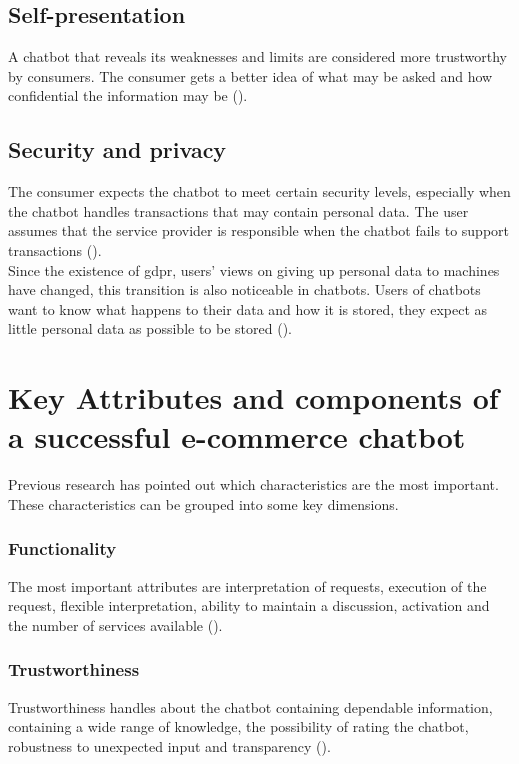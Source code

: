 \subsection{Self-presentation}
A chatbot that reveals its weaknesses and limits are considered more trustworthy by consumers. The consumer gets a better idea of what may be asked and how confidential the information may be (\cite{Følstad2018}).

\subsection{Security and privacy}
The consumer expects the chatbot to meet certain security levels, especially when the chatbot handles transactions that may contain personal data. The user assumes that the service provider is responsible when the chatbot fails to support transactions (\cite{Følstad2018, Nordheim2019}).\\
\break
Since the existence of \acrfull{gdpr}, users' views on giving up personal data to machines have changed, this transition is also noticeable in chatbots. Users of chatbots want to know what happens to their data and how it is stored, they expect as little personal data as possible to be stored (\cite{Følstad2018, Nordheim2019}). 


\section{Key Attributes and components of a successful e-commerce chatbot}
Previous research has pointed out which characteristics are the most important. These characteristics can be grouped into some key dimensions.\\

\subsubsection{Functionality}
The most important attributes are interpretation of requests, execution of the request, flexible interpretation, ability to maintain a discussion, activation and the number of services available (\cite{Muizzah2021, Verkeyn2018}).\\

\subsubsection{Trustworthiness}
Trustworthiness handles about the chatbot containing dependable information, containing a wide range of knowledge, the possibility of rating the chatbot, robustness to unexpected input and transparency (\cite{Muizzah2021, Verkeyn2018}).

